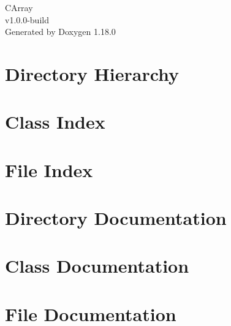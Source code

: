 \documentclass[twoside]{book}
\newcommand{\+}{\discretionary{\mbox{\scriptsize$\hookleftarrow$}}{}{}}
\newcommand{\clearemptydoublepage}{%
    \newpage{\pagestyle{empty}\cleardoublepage}%
  }
\begin{document}
  \raggedbottom
    \hypersetup{pageanchor=false,
                bookmarksnumbered=true,
                pdfencoding=unicode
               }
  \begin{titlepage}
  \vspace*{7cm}
  \begin{center}%
  {\Large CArray}\\
  [1ex]\large v1.\+0.\+0-\/build \\
  \vspace*{1cm}
  {\large Generated by Doxygen 1.18.0}\\
  \end{center}
  \end{titlepage}
  \clearemptydoublepage
  \tableofcontents
  \clearemptydoublepage
  \hypersetup{pageanchor=true}

\chapter{Directory Hierarchy}

\chapter{Class Index}

\chapter{File Index}

\chapter{Directory Documentation}


\chapter{Class Documentation}

\chapter{File Documentation}





  \backmatter
  \newpage
  \clearemptydoublepage
  \printindex
\end{document}
